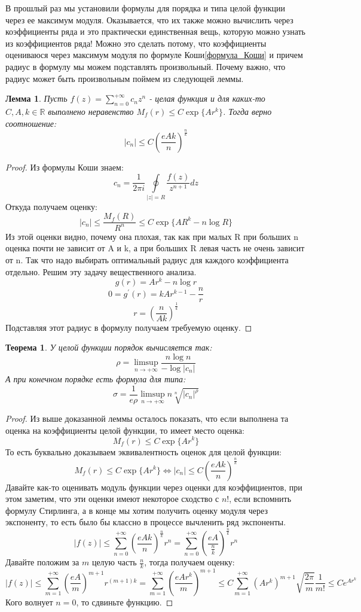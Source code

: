\documentclass[12pt,a4paper]{article} %
\newtheorem{theorem}{Теорема}
\newtheorem{lemma}{Лемма}
\newcommand{\R}{\mathbb{R}}
\begin{document}
	В прошлый раз мы установили формулы для порядка и типа целой функции через ее максимум модуля. Оказывается, что их также можно вычислить через коэффициенты ряда и это практически единственная вещь, которую можно узнать из коэффициентов ряда! Можно это сделать потому, что коэффициенты оцениваюся через максимум модуля по формуле Коши\eqref{формула_Коши} и причем радиус в формулу мы можем подставлять произвольный. Почему важно, что радиус может быть произвольным поймем из следующей леммы.
	\begin{lemma}
		Пусть $f(z)=\displaystyle\sum_{n=0}^{+\infty}c_nz^n$ -  целая функция и для каких-то $C,A,k\in\R$ выполнено неравенство $M_f(r)\leq C\exp\{Ar^k\}$. Тогда верно соотношение:
		$$|c_n|\leq C\left(\frac{eAk}{n}\right)^{\frac{n}{k}}$$
	\end{lemma}
	\begin{proof}
		Из формулы Коши знаем:
		$$c_n=\frac{1}{2\pi i}\oint\limits_{|z|=R}\frac{f(z)}{z^{n+1}}dz$$
		Откуда получаем оценку:
		$$|c_n|\leq\frac{M_f(R)}{R^n}\leq C\exp\{AR^k-n\log R\}$$
		Из этой оценки видно, почему она плохая, так как при малых R при больших n оценка почти не зависит от A и k, а при больших R левая часть не очень зависит от n. Так что надо выбирать оптимальный радиус для каждого коэффициента отдельно. Решим эту задачу вещественного анализа.
		$$g(r)=Ar^k-n\log r$$
		$$0=g^{'}(r)=kAr^{k-1}-\frac{n}{r}$$
		$$r=\left(\frac{n}{Ak}\right)^{\frac{1}{k}}$$
		Подставляя этот радиус в формулу получаем требуемую оценку.
	\end{proof}
	\begin{theorem}
		У целой функции порядок вычисляется так:
		$$\rho=\limsup\limits_{n\rightarrow+\infty}\frac{n\log n}{-\log|c_n|}$$
		А при конечном порядке есть формула для типа:
		$$\sigma=\frac{1}{e\rho}\limsup\limits_{n\rightarrow+\infty}n\sqrt[n]{|c_n|^{\rho}}$$
	\end{theorem}
	\begin{proof}
		Из выше доказанной леммы осталось показать, что если выполнена та оценка на коэффициенты целой функции, то имеет место оценка:
		$$M_f(r)\leq C\exp\{Ar^k\}$$
		То есть буквально доказываем эквивалентность оценок для целой функции:
		$$M_f(r)\leq C\exp\{Ar^k\}\Leftrightarrow|c_n|\leq C\left(\frac{eAk}{n}\right)^{\frac{n}{k}}$$
		Давайте как-то оценивать модуль функции через оценки для коэффициентов, при этом заметим, что эти оценки имеют некоторое сходство с $n!$, если вспомнить формулу Стирлинга, а в конце мы хотим получить оценку модуля через экспоненту, то есть было бы классно в процессе вычленить ряд экспоненты.
		$$|f(z)|\leq\sum_{n=0}^{+\infty}\left(\frac{eAk}{n}\right)^{\frac{n}{k}}r^n=\sum_{n=0}^{+\infty}\left(\frac{eA}{\frac{n}{k}}\right)^{\frac{n}{k}}r^n$$
		Давайте положим за $m$ целую часть $\frac{n}{k}$, тогда получаем оценку:
		$$|f(z)|\leq\sum_{m=1}^{+\infty}\left(\frac{eA}{m}\right)^{m+1}r^{(m+1)k}=\sum_{m=1}^{+\infty}\left(\frac{eAr^k}{m}\right)^{m+1}\leq C\sum_{m=1}^{+\infty}(Ar^k)^{m+1}\sqrt{\frac{2\pi}{m}}\frac{1}{m!}\leq Ce^{Ar^k}$$
		Кого волнует $n=0$, то сдвиньте функцию.
	\end{proof}
\end{document}
